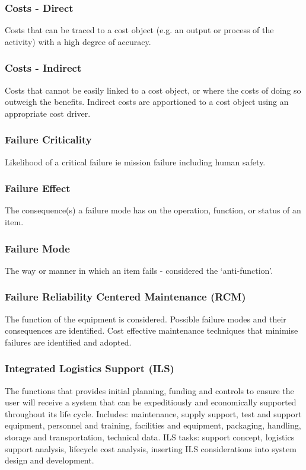 \documentclass[journal]{IEEEtran}
\begin{document}
\subsubsection{Costs - Direct}
Costs that can be traced to a cost object (e.g. an output or process of the activity) with a high degree of accuracy.
\subsubsection{Costs - Indirect}
Costs that cannot be easily linked to a cost object, or where the costs of doing so outweigh the benefits. Indirect costs are apportioned to a cost object using an appropriate cost driver.
\subsubsection{Failure Criticality}
Likelihood of a critical failure ie mission failure including human safety.
\subsubsection{Failure Effect}
The consequence(s) a failure mode has on the operation, function, or status of an item.
\subsubsection{Failure Mode}
The way or manner in which an item fails - considered the `anti-function'.
\subsubsection{Failure Reliability Centered Maintenance (RCM)}
The function of the equipment is considered. Possible failure modes and their consequences are identified. Cost effective maintenance techniques that minimise failures are identified and adopted.
\subsubsection{Integrated Logistics Support (ILS)}
The functions that provides initial planning, funding and controls to ensure the user will receive a system that can be expeditiously and economically supported throughout its life cycle. Includes: maintenance, supply support, test and support equipment, personnel and training, facilities and equipment, packaging, handling, storage and transportation, technical data. ILS tasks: support concept, logistics support analysis, lifecycle cost analysis, inserting ILS considerations into system design and development.
\end{document}
